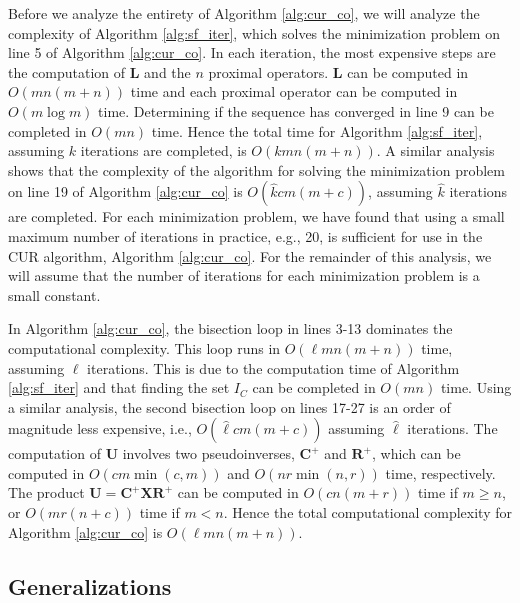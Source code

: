 \documentclass[12pt]{article}
\begin{document}
Before we analyze the entirety of Algorithm \ref{alg:cur_co}, we will analyze the complexity of Algorithm \ref{alg:sf_iter}, which solves the minimization problem on line 5 of Algorithm \ref{alg:cur_co}.  In each iteration, the most expensive steps are the computation of $\mathbf{L}$ and the $n$ proximal operators.  $\mathbf{L}$ can be computed in $O(mn(m+n))$ time and each proximal operator can be computed in $O(m \log m)$ time.  Determining if the sequence has converged in line 9 can be completed in $O(mn)$ time.  Hence the total time for Algorithm \ref{alg:sf_iter}, assuming $k$ iterations are completed, is $O(kmn(m+n))$.  A similar analysis shows that the complexity of the algorithm for solving the minimization problem on line 19 of Algorithm \ref{alg:cur_co} is $O(\hat{k}cm(m+c))$, assuming $\hat{k}$ iterations are completed.  For each minimization problem, we have found that using a small maximum number of iterations in practice, e.g., 20, is sufficient for use in the CUR algorithm, Algorithm \ref{alg:cur_co}. For the remainder of this analysis, we will assume that the number of iterations for each minimization problem is a small constant.

In Algorithm \ref{alg:cur_co}, the bisection loop in lines 3-13 dominates the computational complexity.  This loop runs in $O(\ell mn(m+n))$ time, assuming $\ell$ iterations.  This is due to the computation time of Algorithm \ref{alg:sf_iter} and that finding the set $I_C$ can be completed in $O(mn)$ time.  Using a similar analysis, the second bisection loop on lines 17-27 is an order of magnitude less expensive, i.e., $O(\hat{\ell} cm(m+c))$ assuming $\hat{\ell}$ iterations. The computation of $\mathbf{U}$ involves two pseudoinverses, $\mathbf{C^+}$ and $\mathbf{R^+}$, which can be computed in $O(cm \min(c,m))$ and $O(nr \min(n,r))$ time, respectively.  The product $\mathbf{U = C^+XR^+}$ can be computed in $O(cn(m+r))$ time if $m \geq n$, or $O(mr(n+c))$ time if $m < n$.  Hence the total computational complexity for Algorithm \ref{alg:cur_co} is $O(\ell mn(m+n))$.


\subsection{Generalizations}
\label{sec:cur_gen}
\end{document}
